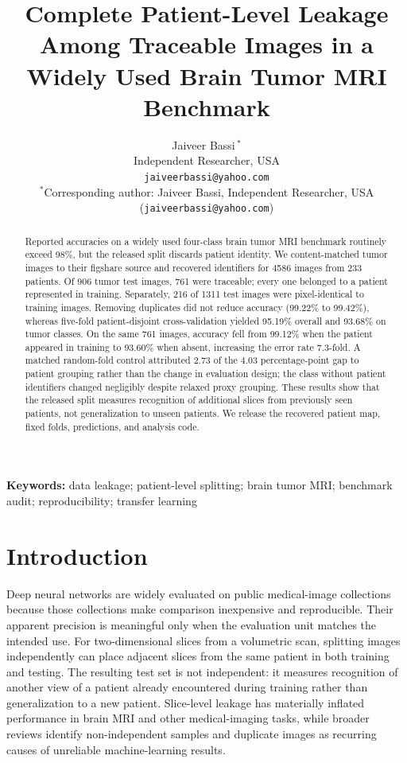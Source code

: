 ﻿\documentclass[twocolumn]{article}
\title{\textbf{Complete Patient-Level Leakage Among Traceable Images in a Widely Used Brain Tumor MRI Benchmark}}
\author{Jaiveer Bassi\,\orcidlink{0009-0006-3633-3220}$^{*}$\\
Independent Researcher, USA\\
\texttt{jaiveerbassi@yahoo.com}\\[2pt]
{\small $^{*}$Corresponding author: Jaiveer Bassi, Independent Researcher, USA (\texttt{jaiveerbassi@yahoo.com})}}
\date{}
\begin{document}
\maketitle
\linenumbers
\begin{abstract}
Reported accuracies on a widely used four-class brain tumor MRI benchmark routinely exceed 98\%, but the released split discards patient identity. We content-matched tumor images to their figshare source and recovered identifiers for 4586 images from 233 patients. Of 906 tumor test images, 761 were traceable; every one belonged to a patient represented in training. Separately, 216 of 1311 test images were pixel-identical to training images. Removing duplicates did not reduce accuracy (99.22\% to 99.42\%), whereas five-fold patient-disjoint cross-validation yielded 95.19\% overall and 93.68\% on tumor classes. On the same 761 images, accuracy fell from 99.12\% when the patient appeared in training to 93.60\% when absent, increasing the error rate 7.3-fold. A matched random-fold control attributed 2.73 of the 4.03 percentage-point gap to patient grouping rather than the change in evaluation design; the class without patient identifiers changed negligibly despite relaxed proxy grouping. These results show that the released split measures recognition of additional slices from previously seen patients, not generalization to unseen patients. We release the recovered patient map, fixed folds, predictions, and analysis code.
\end{abstract}

\vspace{0.5em}
\noindent\textbf{Keywords:} data leakage; patient-level splitting; brain tumor MRI; benchmark audit; reproducibility; transfer learning

\section{Introduction}
Deep neural networks are widely evaluated on public medical-image collections because those collections make comparison inexpensive and reproducible. Their apparent precision is meaningful only when the evaluation unit matches the intended use. For two-dimensional slices from a volumetric scan, splitting images independently can place adjacent slices from the same patient in both training and testing. The resulting test set is not independent: it measures recognition of another view of a patient already encountered during training rather than generalization to a new patient. Slice-level leakage has materially inflated performance in brain MRI and other medical-imaging tasks\cite{yagis2021effect,wen2020convolutional}, while broader reviews identify non-independent samples and duplicate images as recurring causes of unreliable machine-learning results\cite{kapoor2023leakage,roberts2021common}.
\end{document}
